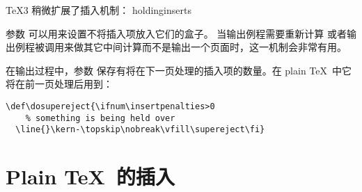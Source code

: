 \documentclass{book}
\begin{document}

\TeX3 稍微扩展了插入机制：
\handbreak \cstoidx holdinginserts\par
{}
参数  可以用来设置不将插入项放入它们的盒子。
当输出例程需要重新计算  或者输出例程被调用来做其它中间计算而不是输出一个页面时，这一机制会非常有用。




在输出过程中，参数  保存有将在下一页处理的插入项的数量。在 plain \TeX\ 中它将在前一页处理后用到：

\begin{verbatim}
\def\dosupereject{\ifnum\insertpenalties>0
    % something is being held over
  \line{}\kern-\topskip\nobreak\vfill\supereject\fi}
\end{verbatim}

\section{Plain \TeX\ 的插入}

\end{document}
